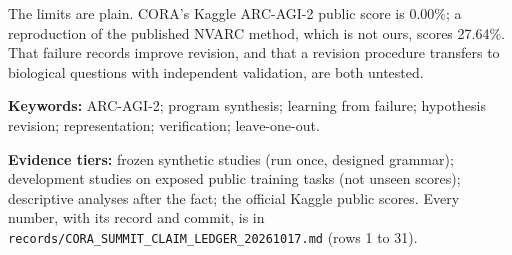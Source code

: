 \documentclass[11pt]{article}
\begin{document}
The limits are plain. CORA's Kaggle ARC-AGI-2 public score is 0.00\%; a reproduction of the published NVARC method,
which is not ours, scores 27.64\%. That failure records improve revision, and that a revision procedure transfers to
biological questions with independent validation, are both untested.

\vfill
{\small\color{ink2}
\textbf{Keywords:} ARC-AGI-2; program synthesis; learning from failure; hypothesis revision; representation;
verification; leave-one-out.\par
\textbf{Evidence tiers:} frozen synthetic studies (run once, designed grammar); development studies on exposed public
training tasks (not unseen scores); descriptive analyses after the fact; the official Kaggle public scores. Every
number, with its record and commit, is in \texttt{records/CORA\_SUMMIT\_CLAIM\_LEDGER\_20261017.md} (rows 1 to 31).\par}
\end{document}
